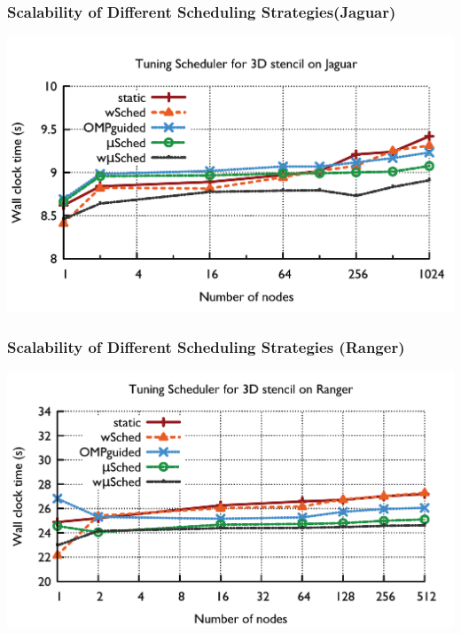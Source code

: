 \begin{frame}
\frametitle{Scalability of Different Scheduling Strategies(Jaguar)}
\includegraphics[width=\textwidth]{images/schedulerTuningJaguar}
\end{frame} 

\begin{frame}
\frametitle{Scalability of Different Scheduling Strategies (Ranger)}
\includegraphics[width=\textwidth]{images/schedulerTuningRanger}
\end{frame}

